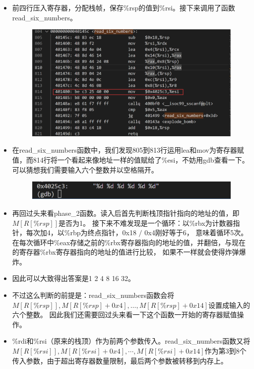 \documentclass[12pt, a4paper, oneside]{ctexart}
\begin{document}
\begin{itemize}
    \item 前四行压入寄存器，分配栈帧，保存\%rsp的值到\%rsi。接下来调用了函数read\_six\_numbers。
    \begin{figure}[htbp]
    \includegraphics[scale=0.4]{image/2.3-2.png}
    \end{figure}  
    \item 在read\_six\_numbers函数中，我们发现805到813行运用lea和mov为寄存器赋值，而814行将一个看起来像地址一样的值赋给了\%esi，不妨用gdb查看一下。可以猜想我们需要输入六个整数并以空格隔开。
    \begin{figure}[htbp]
    \includegraphics[scale=0.4]{image/2.3-3.png}
    \end{figure}   
    \item 再回过头来看phase\_2函数。读入后首先判断栈顶指针指向的地址的值，即$M[R[\%rsp]]$是否为1。
    接下来不难发现是一个循环：以\%rbx为计数器指针，每次加4，以\%rbp为终点指针，0x18 $/$ 0x4刚好等于6，
    意味着循环5次。在每次循环中\%eax存储之前的\%rbx寄存器指向的地址的值，并翻倍，与现在的寄存器\%rbx寄存器指向的地址的值进行比较，
    如果不一样就会使得炸弹爆炸。
    \item 因此可以大致得出答案是1 2 4 8 16 32。
    \item 不过这么判断的前提是：read\_six\_numbers函数会将$M[R[\%rsp]], M[R[\%rsp] + 0x4], \dots, M[R[\%rsp] + 0x14]$设置成输入的六个整数。
    因此我们还需要回过头来看一下这个函数一开始的寄存器赋值操作。
    \item \%rdi和\%rsi（原来的栈顶）作为前两个参数传入。read\_six\_numbers函数又将$M[R[\%rsi]], M[R[\%rsi] + 0x4], \cdots, M[R[\%rsi] + 0x14]$作为第3到8个传入参数，由于超出寄存器数量限制，最后两个参数被转移到内存上。

\end{itemize}
\end{document}
